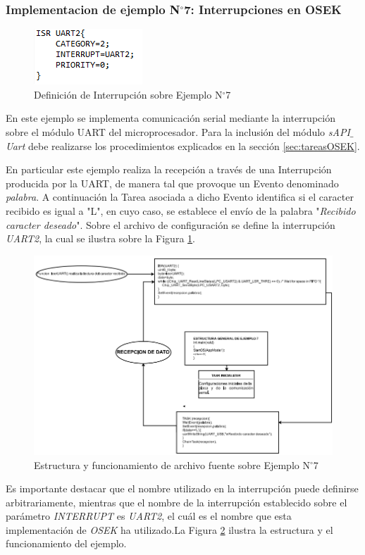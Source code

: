 \documentclass[12pt,letterpaper]{article}
\begin{document}
\subsubsection{Implementacion de ejemplo N$^{\circ}$7: Interrupciones en OSEK}
\begin{figure}[!h]
\centering
\includegraphics[width=5 cm]{figuras/f35.png}
\caption{Definición de Interrupción sobre Ejemplo N$^{\circ}$7}
\label{Fig44}
\end{figure}
En este ejemplo se implementa comunicación serial mediante la interrupción sobre el módulo UART del microprocesador. Para la inclusión del módulo \textit{sAPI$\_$Uart} debe realizarse los procedimientos explicados en la sección \ref{sec:tareasOSEK}. 

En particular este ejemplo realiza la recepción a través de una Interrupción producida por la UART, de manera tal que provoque un Evento denominado \textit{palabra}. A continuación la Tarea asociada a dicho Evento identifica si el caracter recibido es igual a "L", en cuyo caso, se establece el envío de la palabra "\textit{Recibido caracter deseado}". Sobre el archivo de configuración se define la interrupción \textit{UART2}, la cual se ilustra sobre la Figura \ref{Fig44}.
\begin{center}
\begin{figure}[!h]
\centering
\includegraphics[width=15 cm]{figuras/f38.png}
\caption{Estructura y funcionamiento de archivo fuente sobre Ejemplo N$^{\circ}$7}
\label{Fig45}
\end{figure}
\end{center}
Es importante destacar que el nombre utilizado en la interrupción puede definirse arbitrariamente, mientras que el nombre de la interrupción establecido sobre el parámetro \textit{INTERRUPT} es \textit{UART2}, el cuál es el nombre que esta implementación de \textit{OSEK} ha utilizado.La Figura \ref{Fig45} ilustra la estructura y el funcionamiento del ejemplo.
\end{document}
